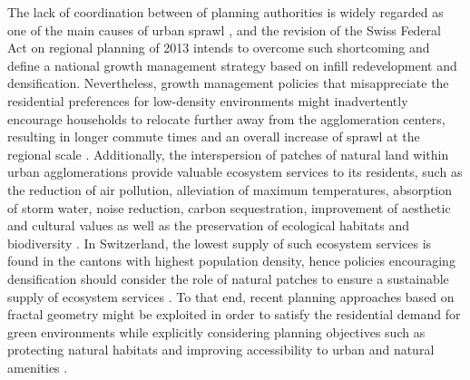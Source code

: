 \documentclass[10pt,letterpaper]{article}
\begin{document}
The lack of coordination between of planning authorities is widely regarded as one of the main causes of urban sprawl \cite{carruthers2002fragmentation, mann2009institutional}, and the revision of the Swiss Federal Act on regional planning of 2013 intends to overcome such shortcoming and define a national growth management strategy based on infill redevelopment and densification.
Nevertheless, growth management policies that misappreciate the residential preferences for low-density environments might inadvertently encourage households to relocate further away from the agglomeration centers, resulting in longer commute times and an overall increase of sprawl at the regional scale \cite{schwanen2004policies, robinson2005twenty}.
Additionally, the interspersion of patches of natural land within urban agglomerations provide valuable ecosystem services to its residents, such as the reduction of air pollution, alleviation of maximum temperatures, absorption of storm water, noise reduction, carbon sequestration, improvement of aesthetic and cultural values as well as the preservation of ecological habitats and biodiversity \cite{bolund1999ecosystem, gomez2013classifying}.
In Switzerland, the lowest supply of such ecosystem services is found in the cantons with highest population density, hence policies encouraging densification should consider the role of natural patches to ensure a sustainable supply of ecosystem services \cite{jaligot2019historical}.
To that end, recent planning approaches based on fractal geometry \cite{yamu2015spatial} might be exploited in order to satisfy the residential demand for green environments while explicitly considering planning objectives such as protecting natural habitats and improving accessibility to urban and natural amenities \cite{bosch2019addressing}.
\end{document}
